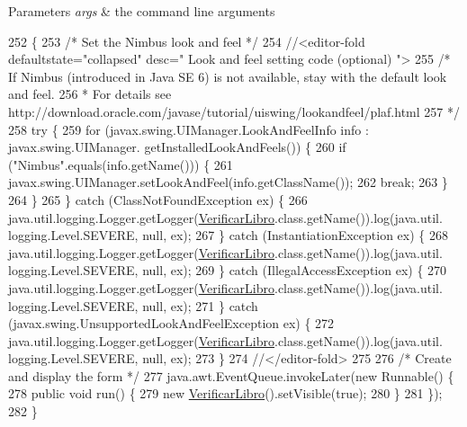 \begin{DoxyParams}{Parameters}
{\em args} & the command line arguments \\
\hline
\end{DoxyParams}

\begin{DoxyCode}
252                                            \{
253         \textcolor{comment}{/* Set the Nimbus look and feel */}
254         \textcolor{comment}{//<editor-fold defaultstate="collapsed" desc=" Look and feel setting code (optional) ">}
255         \textcolor{comment}{/* If Nimbus (introduced in Java SE 6) is not available, stay with the default look and feel.}
256 \textcolor{comment}{         * For details see http://download.oracle.com/javase/tutorial/uiswing/lookandfeel/plaf.html }
257 \textcolor{comment}{         */}
258         \textcolor{keywordflow}{try} \{
259             \textcolor{keywordflow}{for} (javax.swing.UIManager.LookAndFeelInfo info : javax.swing.UIManager.
      getInstalledLookAndFeels()) \{
260                 \textcolor{keywordflow}{if} (\textcolor{stringliteral}{"Nimbus"}.equals(info.getName())) \{
261                     javax.swing.UIManager.setLookAndFeel(info.getClassName());
262                     \textcolor{keywordflow}{break};
263                 \}
264             \}
265         \} \textcolor{keywordflow}{catch} (ClassNotFoundException ex) \{
266             java.util.logging.Logger.getLogger(\mbox{\hyperlink{class_interfaz_package_1_1_verificar_libro_ac01e8d1171535f57f24d6eed709a3d2b}{VerificarLibro}}.class.getName()).log(java.util.
      logging.Level.SEVERE, null, ex);
267         \} \textcolor{keywordflow}{catch} (InstantiationException ex) \{
268             java.util.logging.Logger.getLogger(\mbox{\hyperlink{class_interfaz_package_1_1_verificar_libro_ac01e8d1171535f57f24d6eed709a3d2b}{VerificarLibro}}.class.getName()).log(java.util.
      logging.Level.SEVERE, null, ex);
269         \} \textcolor{keywordflow}{catch} (IllegalAccessException ex) \{
270             java.util.logging.Logger.getLogger(\mbox{\hyperlink{class_interfaz_package_1_1_verificar_libro_ac01e8d1171535f57f24d6eed709a3d2b}{VerificarLibro}}.class.getName()).log(java.util.
      logging.Level.SEVERE, null, ex);
271         \} \textcolor{keywordflow}{catch} (javax.swing.UnsupportedLookAndFeelException ex) \{
272             java.util.logging.Logger.getLogger(\mbox{\hyperlink{class_interfaz_package_1_1_verificar_libro_ac01e8d1171535f57f24d6eed709a3d2b}{VerificarLibro}}.class.getName()).log(java.util.
      logging.Level.SEVERE, null, ex);
273         \}
274         \textcolor{comment}{//</editor-fold>}
275 
276         \textcolor{comment}{/* Create and display the form */}
277         java.awt.EventQueue.invokeLater(\textcolor{keyword}{new} Runnable() \{
278             \textcolor{keyword}{public} \textcolor{keywordtype}{void} run() \{
279                 \textcolor{keyword}{new} \mbox{\hyperlink{class_interfaz_package_1_1_verificar_libro_ac01e8d1171535f57f24d6eed709a3d2b}{VerificarLibro}}().setVisible(\textcolor{keyword}{true});
280             \}
281         \});
282     \}
\end{DoxyCode}


